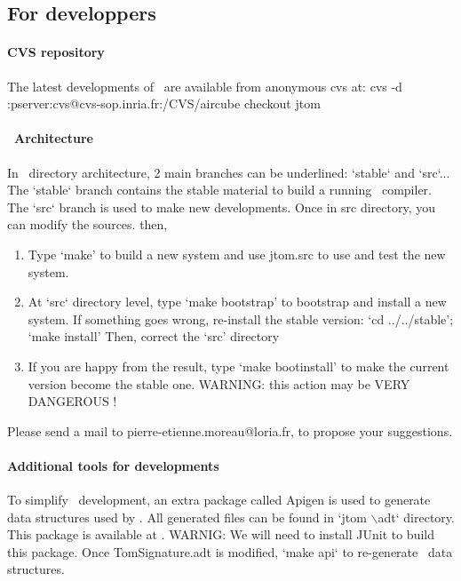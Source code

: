 \subsection{For developpers}
\paragraph{CVS repository}
The latest developments of \TOM\ are available from anonymous cvs at:
cvs -d :pserver:cvs@cvs-sop.inria.fr:/CVS/aircube checkout jtom
\paragraph{\TOM\ Architecture}
In \TOM\ directory architecture, 2 main branches can be underlined:
`stable` and `src`...
The `stable` branch contains the stable material to build a running
\TOM\ compiler. The `src` branch is used to make new developments.
Once in src directory, you can modify the sources. then, 
\begin{enumerate}
\item Type `make' to build a new system and use jtom.src to use and
  test the new system.
\item At `src` directory level, type `make bootstrap' to bootstrap and
  install a new system.
  If something goes wrong, re-install the stable version:
  `cd ../../stable'; `make install'
  Then, correct the `src' directory
\item If you are happy from the result, type `make bootinstall' to
  make the current version become the stable one.
     WARNING: this action may be VERY DANGEROUS !
\end{enumerate}
Please send a mail to pierre-etienne.moreau@loria.fr, to propose your
suggestions.

\paragraph{Additional tools for developments}
To simplify \TOM\ development, an extra package called Apigen is used
to generate data structures used by \TOM. All generated files can be
found in `jtom $\backslash$adt` directory.
This package is available at
.
WARNIG: We will need to install JUnit to build this package.
Once TomSignature.adt is modified, `make api` to re-generate \TOM\
data structures.
